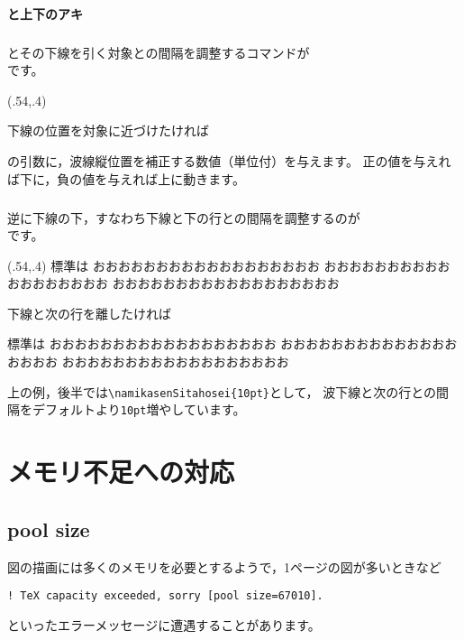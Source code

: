 \documentclass[fleqn,a4j]{jarticle}
\begin{document}
\paragraph{と上下のアキ}
\subparagraph{}
とその下線を引く対象との間隔を調整するコマンドが\\
です。

\begin{showEx}(.54,.4){}

下線の位置を対象に近づけたければ

\namikasenUehosei{-2pt}
\end{showEx}

の引数に，波線縦位置を補正する数値（単位付）を与えます。
正の値を与えれば下に，負の値を与えれば上に動きます。

\subparagraph{}
逆に下線の下，すなわち下線と下の行との間隔を調整するのが\\
です。

\begin{showEx}(.54,.4){}
標準は
おおおおおおおおおおおおおおおおおお
おおおおおおおおおおおおおおおおおお
おおおおおおおおおおおおおおおおおお

下線と次の行を離したければ

\namikasenSitahosei{10pt}
標準は
おおおおおおおおおおおおおおおおおお
おおおおおおおおおおおおおおおおおお
おおおおおおおおおおおおおおおおおお
\end{showEx}

上の例，後半では\verb+\namikasenSitahosei{10pt}+として，
波下線と次の行との間隔をデフォルトより\verb+10pt+増やしています。

\section{メモリ不足への対応}
\subsection{pool size}
図の描画には多くのメモリを必要とするようで，1ページの図が多いときなど
\begin{jquote}
\begin{verbatim}
! TeX capacity exceeded, sorry [pool size=67010].
\end{verbatim}
\end{jquote}
といったエラーメッセージに遭遇することがあります。
\end{document}
